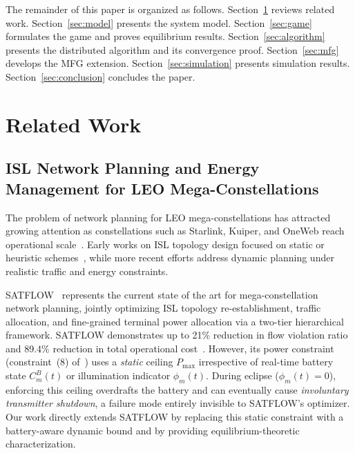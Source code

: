 \documentclass[journal]{IEEEtran}
\newcommand{\CB}{C^{B}}
\begin{document}
The remainder of this paper is organized as follows. Section~\ref{sec:related} reviews related work. Section~\ref{sec:model} presents the system model. Section~\ref{sec:game} formulates the game and proves equilibrium results. Section~\ref{sec:algorithm} presents the distributed algorithm and its convergence proof. Section~\ref{sec:mfg} develops the MFG extension. Section~\ref{sec:simulation} presents simulation results. Section~\ref{sec:conclusion} concludes the paper.

\section{Related Work}
\label{sec:related}

\subsection{ISL Network Planning and Energy Management
for LEO Mega-Constellations}

The problem of network planning for LEO mega-constellations has attracted growing attention as constellations such as Starlink, Kuiper, and OneWeb reach operational scale~\cite{kodheli2020survey}. Early works on ISL topology design focused on static or heuristic schemes~\cite{leyva2021connectivity,di2019ultra}, while more recent efforts address dynamic planning under realistic traffic and energy constraints.

SATFLOW~\cite{cen2024satflow} represents the current state of the art for mega-constellation network planning, jointly optimizing ISL topology re-establishment, traffic allocation, and fine-grained terminal power allocation via a two-tier hierarchical framework. SATFLOW demonstrates up to 21\% reduction in flow violation ratio and 89.4\% reduction in total operational cost~\cite{cen2024satflow}. However, its power constraint (constraint~(8) of~\cite{cen2024satflow}) uses a \emph{static} ceiling $P_{\max}$ irrespective of real-time battery state $\CB_m(t)$ or illumination indicator $\phi_m(t)$. During eclipse ($\phi_m(t)=0$), enforcing this ceiling overdrafts the battery and can eventually cause
\emph{involuntary transmitter shutdown}, a failure
mode entirely invisible to SATFLOW's optimizer. Our work directly extends SATFLOW by replacing this static constraint with a battery-aware dynamic bound and by providing equilibrium-theoretic characterization.
\end{document}
